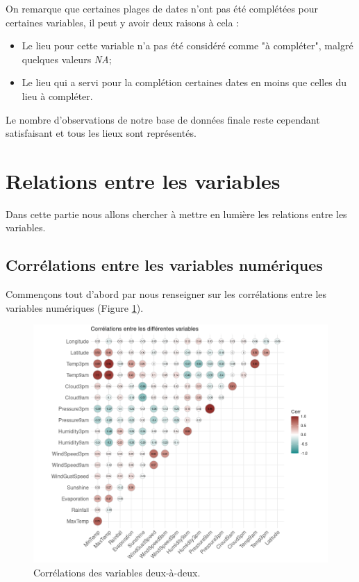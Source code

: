\documentclass{article}
\begin{document}
On remarque que certaines plages de dates n'ont pas été complétées pour certaines variables, il peut y avoir deux raisons à cela : 
\begin{itemize}
    \item Le lieu pour cette variable n'a pas été considéré comme "à compléter", malgré quelques valeurs \emph{NA};
    \item Le lieu qui a servi pour la complétion certaines dates en moins que celles du lieu à compléter.
\end{itemize}
Le nombre d'observations de notre base de données finale reste cependant satisfaisant et tous les lieux sont représentés.

\section{Relations entre les variables}

Dans cette partie nous allons chercher à mettre en lumière les relations entre les variables.

\subsection{Corrélations entre les variables numériques}

Commençons tout d'abord par nous renseigner sur les corrélations entre les variables numériques (Figure \ref{fig:correlations}). 

\begin{figure}[htp]
    \centering
    \includegraphics[width=\textwidth]{Images/correlations_variables.png}
    \caption{Corrélations des variables deux-à-deux.}
    \label{fig:correlations}
\end{figure}
\end{document}
